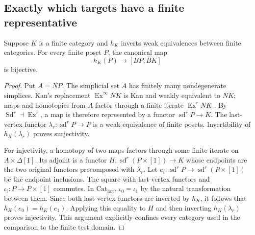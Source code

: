 \subsection{Exactly which targets have a finite representative}

\begin{lemma}
\label{CD:finitepoly}
Suppose $K$ is a finite category and $h_K$ inverts weak equivalences
between finite categories.  For every finite poset $P$, the canonical map
\[
             h_K(P)\longrightarrow[BP,BK]
\]
is bijective.
\end{lemma}
\begin{proof}
Put $A=NP$.  The simplicial set $A$ has finitely many nondegenerate
simplices.  Kan's replacement $\operatorname{Ex}^{\infty}NK$ is Kan
and weakly equivalent to $NK$; maps and homotopies from $A$ factor
through a finite iterate $\operatorname{Ex}^rNK$
\cite[\S\S4,6--8]{CDKan1957}.  By
$\operatorname{Sd}^r\dashv\operatorname{Ex}^r$, a map is therefore
represented by a functor $\operatorname{sd}^rP\to K$.
The last-vertex functor
$\lambda_r:\operatorname{sd}^rP\to P$ is a weak equivalence of finite
posets.  Invertibility of $h_K(\lambda_r)$ proves surjectivity.

For injectivity, a homotopy of two maps factors through some finite
iterate on $A\times\Delta[1]$.  Its adjoint is a functor
$H:\operatorname{sd}^r(P\times[1])\to K$ whose endpoints are the two
original functors precomposed with $\lambda_r$.
Let $e_i:\operatorname{sd}^rP\to
\operatorname{sd}^r(P\times[1])$ be the endpoint inclusions.
The square with last-vertex functors and
$\iota_i:P\to P\times[1]$ commutes.  In
$\mathrm{Cat}_{\mathrm{hot}}$, $\iota_0=\iota_1$ by the natural
transformation between them.  Since both last-vertex functors are
inverted by $h_K$, it follows that $h_K(e_0)=h_K(e_1)$.
Applying this equality to $H$ and then inverting $h_K(\lambda_r)$
proves injectivity.  This argument explicitly confines every category
used in the comparison to the finite test domain.
\end{proof}

